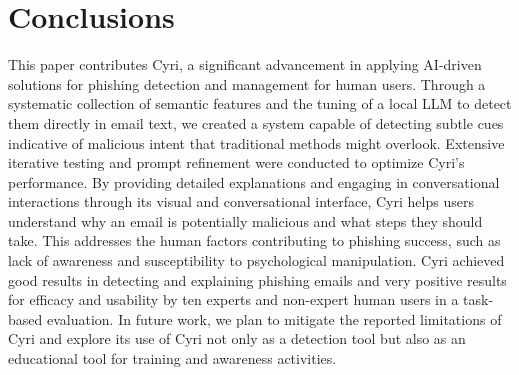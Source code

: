 \section{Conclusions}
\label{sec:conclusions}

This paper contributes Cyri, a significant advancement in applying AI-driven
solutions for phishing detection and management for human users. 
Through a systematic collection of semantic features and the tuning of a local LLM to detect them directly in email text, we created a system capable of detecting subtle cues indicative of malicious intent that traditional methods might overlook.
Extensive iterative testing and prompt refinement were conducted to optimize
Cyri's performance. By providing detailed explanations and engaging in conversational interactions through its visual and conversational interface, Cyri helps users understand why an email is potentially malicious and what steps they should take.
This addresses the human factors contributing to phishing success, such as lack of awareness and susceptibility to psychological manipulation.
Cyri achieved good results in detecting and explaining phishing emails and very positive results for efficacy and usability by ten experts and non-expert human users in a task-based evaluation.
In future work, we plan to mitigate the reported limitations of Cyri and explore its use of Cyri not only as a detection tool but also as an educational tool for training and awareness activities.

